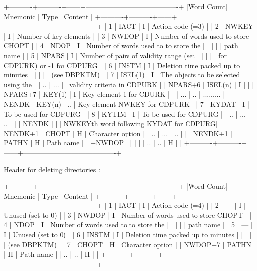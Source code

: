 \begin{XMP}
 +----------+----------+------+----------------------------------------+
 |Word Count| Mnemonic | Type |         Content                        |
 +----------+----------+------+----------------------------------------+
 |        1 |   IACT   |   I  | Action code (=3)                       |
 |        2 |  NWKEY   |   I  | Number of key elements                 |
 |        3 |  NWDOP   |   I  | Number of words used to store CHOPT    |
 |        4 |   NDOP   |   I  | Number of words used to to store the   |
 |          |          |      | path name                              |
 |        5 |  NPARS   |   I  | Number of pairs of validity range (set |
 |          |          |      | for CDPURK) or -1 for CDPURG           |
 |        6 |  INSTM   |   I  | Deletion time packed up to minutes     |
 |          |          |      | (see DBPKTM)                           |
 |        7 |  ISEL(1) |   I  | The objects to be selected using the   |
 |       .. |    ...   |      | validity criteria in CDPURK            |
 |  NPARS+6 |  ISEL(n) |   I  |                                        |
 |  NPARS+7 |  KEY(1)  |   I  | Key element 1 for CDURK                |
 |          |   ...    |  ..  |      .........                         |
 |    NENDK |  KEY(n)  |  ..  | Key element NWKEY for CDPURK           |
 |        7 |  KYDAT   |   I  | To be used for CDPURG                  |
 |        8 |  KYTIM   |   I  | To be used for CDPURG                  |
 |       .. |   ...    |  ..  |                                        |
 |    NENDK |          |      | NWKEYth word following KYDAT for CDPURG|
 |  NENDK+1 |  CHOPT   |   H  | Character option                       |
 |       .. |   ...    |  ..  |                                        |
 |  NENDK+1 |  PATHN   |   H  | Path name                              |
 |   +NWDOP |          |      |                                        |
 |       .. |     ..   |   H  |                                        |
 +----------+----------+------+----------------------------------------+

   Header for deleting directories :

 +----------+----------+------+----------------------------------------+
 |Word Count| Mnemonic | Type |         Content                        |
 +----------+----------+------+----------------------------------------+
 |        1 |   IACT   |   I  | Action code (=4)                       |
 |        2 |    ---   |   I  | Unused (set to 0)                      |
 |        3 |  NWDOP   |   I  | Number of words used to store CHOPT    |
 |        4 |   NDOP   |   I  | Number of words used to to store the   |
 |          |          |      | path name                              |
 |        5 |    ---   |   I  | Unused (set to 0)                      |
 |        6 |  INSTM   |   I  | Deletion time packed up to minutes     |
 |          |          |      | (see DBPKTM)                           |
 |        7 |  CHOPT   |   H  | Character option                       |
 |  NWDOP+7 |  PATHN   |   H  | Path name                              |
 |       .. |     ..   |   H  |                                        |
 +----------+----------+------+----------------------------------------+


\end{XMP}
